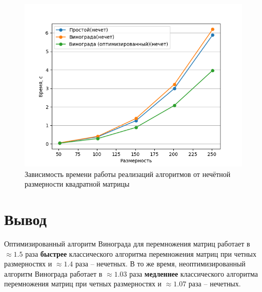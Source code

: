 \begin{figure}[h!]
	\centering
	\includegraphics[scale=0.95]{imgs/2.png}
	\caption{Зависимость времени работы реализаций алгоритмов от нечётной размерности квадратной матрицы}
	\label{img:profiling2}
\end{figure}


\section{Вывод}

Оптимизированный алгоритм Винограда для перемножения матриц работает в $ \approx 1.5 $ раза \textbf{быстрее} классического 
алгоритма перемножения матриц при четных размерностях и $ \approx 1.4 $ раза -- нечетных.
В то же время, неоптимизированный алгоритм Винограда работает в $ \approx 1.03 $ раза \textbf{медленнее} классического 
алгоритма перемножения матриц при четных размерностях и $ \approx 1.07 $ раза -- нечетных.
